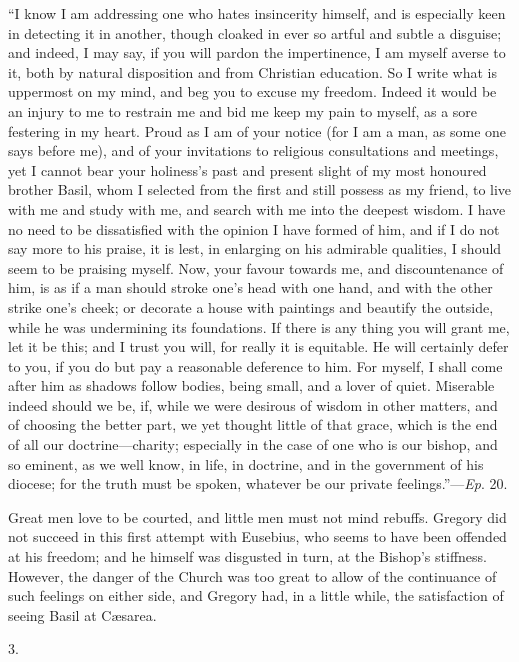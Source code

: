 ``I know I am addressing one who hates insincerity himself, and
is especially keen in detecting it in another, though cloaked in ever
so artful and subtle a disguise; and indeed, I may say, if you will
pardon the impertinence, I am myself averse to it, both by natural
disposition and from Christian education. So I write what is uppermost
on my mind, and beg you to excuse my freedom. Indeed it would be an
injury to me to restrain me and bid me keep my pain to myself, as a
sore festering in my heart. Proud as I am of your notice (for I am a
man, as some one says before me), and of your invitations to religious
consultations and meetings, yet I cannot bear your holiness's past and
present slight of my most honoured brother Basil, whom I selected from
the first and still possess as my friend, to live with me and study
with me, and search with me into the deepest wisdom. I have no need to
be dissatisfied with the opinion I have formed of him, and if I do not
say more to his praise, it is lest, in enlarging on his admirable
qualities, I should seem to be praising myself. Now, your favour
towards me, and discountenance of him, is as if a man should stroke
one's head with one hand, and with the other strike one's cheek; or
decorate a house with paintings and beautify the outside, while he was
undermining its foundations. If there is any thing you will grant me,
let it be this; and I trust you will, for really it is
equitable. He will certainly defer to you, if you do but pay a
reasonable deference to him. For myself, I shall come after him as
shadows follow bodies, being small, and a lover of quiet. Miserable
indeed should we be, if, while we were desirous of wisdom in other
matters, and of choosing the better part, we yet thought little of
that grace, which is the end of all our doctrine—charity; especially
in the case of one who is our bishop, and so eminent, as we well know,
in life, in doctrine, and in the government of his diocese; for the
truth must be spoken, whatever be our private feelings.''—\emph{Ep}.
20.

Great men love to be courted, and little men must not mind rebuffs.
Gregory did not succeed in this first attempt with Eusebius, who seems
to have been offended at his freedom; and he himself was disgusted in
turn, at the Bishop's stiffness. However, the danger of the Church was
too great to allow of the continuance of such feelings on either side,
and Gregory had, in a little while, the satisfaction of seeing Basil
at Cæsarea.

3.

